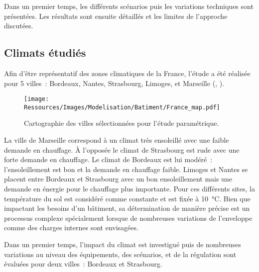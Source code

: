 Dans un premier temps, les différents scénarios puis les variations techniques
sont présentées. Les résultats sont ensuite détaillés et les limites
de l’approche discutées.


\subsection{Climats étudiés} %
\label{sub:climats_etudies}
Afin d’être représentatif des zones climatiques de la France, l’étude a été réalisée
pour 5 villes~: Bordeaux, Nantes, Strasbourg, Limoges, et Marseille (,
).
\begin{figure}
    \centering
    \texttt{[image: Ressources/Images/Modelisation/Batiment/France\_map.pdf]}
    \caption{Cartographie des villes sélectionnées pour l’étude paramétrique.
             \label{fig:carte_france}}
\end{figure}
La ville de Marseille correspond à un climat très ensoleillé avec une faible demande en
chauffage. À l’opposée le climat de Strasbourg est rude avec
une forte demande en chauffage. Le climat de Bordeaux est lui modéré~: l’ensoleillement est bon
et la demande en chauffage faible. Limoges et Nantes se placent entre Bordeaux et
Strasbourg avec un bon ensoleillement mais une demande en énergie pour le chauffage plus
importante. Pour ces différents sites, la température du sol est
considéré comme constante et est fixée à \SI{10}{\celsius}. Bien que impactant les besoins
d’un bâtiment, sa détermination de manière précise est un processus complexe spécialement
lorsque de nombreuses variations de l’enveloppe comme des charges internes sont envisagées.

Dans un premier temps, l’impact du climat est investigué puis de nombreuses variations au
niveau des équipements, des scénarios, et de la régulation sont évaluées pour deux
villes~: Bordeaux et Strasbourg.

